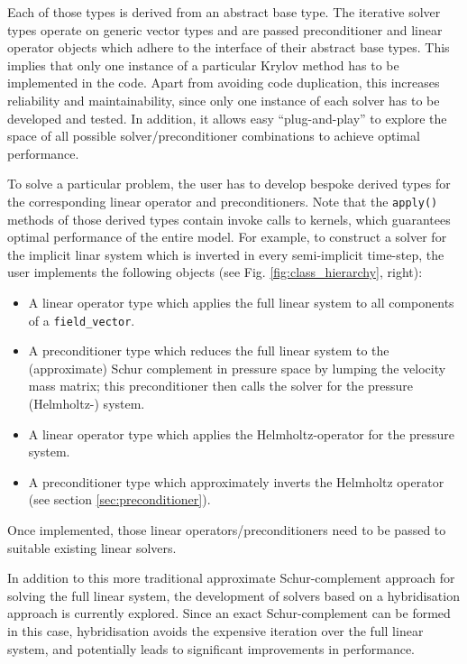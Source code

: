 \documentclass[times]{elsarticle}
\begin{document}
Each of those types is derived from an abstract base type. The
iterative solver types operate on generic vector types and are passed
preconditioner and linear operator objects which adhere to the
interface of their abstract base types.  This implies that only one
instance of a particular Krylov method has to be implemented in the
code. Apart from avoiding code duplication, this increases reliability
and maintainability, since only one instance of each solver has to be
developed and tested. In addition, it allows easy ``plug-and-play'' to
explore the space of all possible solver/preconditioner combinations
to achieve optimal performance.

To solve a particular problem, the user has to develop bespoke derived
types for the corresponding linear operator and preconditioners. Note
that the \texttt{apply()} methods of those derived types contain
invoke calls to kernels, which guarantees optimal performance of the entire
model. For example, to construct a solver for the implicit linar
system which is inverted in every semi-implicit time-step, the user
implements the following objects (see Fig. \ref{fig:class_hierarchy},
right):
\begin{itemize}
\item A linear operator type which applies the full linear system to
  all components of a \texttt{field\_vector}.
\item A preconditioner type which reduces the full linear system to
  the (approximate) Schur complement in pressure space by lumping the
  velocity mass matrix; this preconditioner then calls the solver for
  the pressure (Helmholtz-) system.
\item A linear operator type which applies the Helmholtz-operator for
  the pressure system.
\item A preconditioner type which approximately inverts the Helmholtz
  operator (see section \ref{sec:preconditioner}).
\end{itemize}
Once implemented, those linear operators/preconditioners need to be
passed to suitable existing linear solvers.

In addition to this more traditional approximate Schur-complement
approach for solving the full linear system, the development of
solvers based on a hybridisation approach is currently explored. Since
an exact Schur-complement can be formed in this case, hybridisation
avoids the expensive iteration over the full linear system, and
potentially leads to significant improvements in performance.
\end{document}
